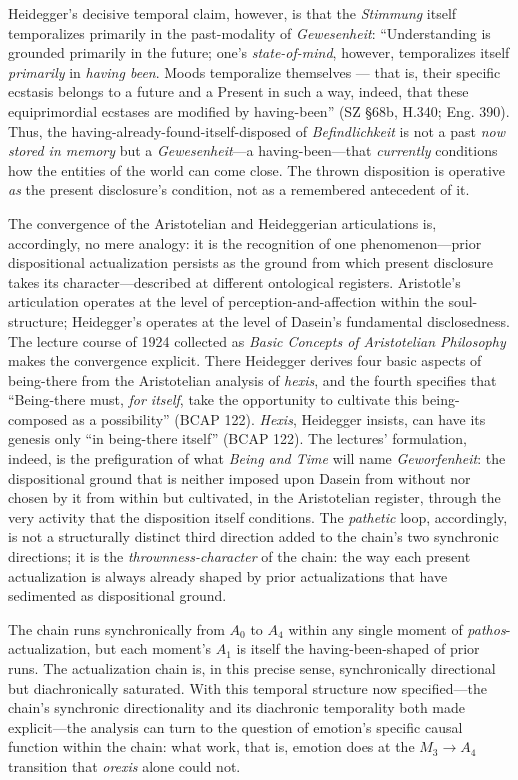 \documentclass{article}
\begin{document}
Heidegger's decisive temporal claim, however, is that the \textit{Stimmung} itself temporalizes primarily in the past-modality of \textit{Gewesenheit}: ``Understanding is grounded primarily in the future; one's \textit{state-of-mind}, however, temporalizes itself \textit{primarily} in \textit{having been}. Moods temporalize themselves --- that is, their specific ecstasis belongs to a future and a Present in such a way, indeed, that these equiprimordial ecstases are modified by having-been'' (SZ \S68b, H.340; Eng. 390). Thus, the having-already-found-itself-disposed of \textit{Befindlichkeit} is not a past \textit{now stored in memory} but a \textit{Gewesenheit}---a having-been---that \textit{currently} conditions how the entities of the world can come close. The thrown disposition is operative \textit{as} the present disclosure's condition, not as a remembered antecedent of it.

The convergence of the Aristotelian and Heideggerian articulations is, accordingly, no mere analogy: it is the recognition of one phenomenon---prior dispositional actualization persists as the ground from which present disclosure takes its character---described at different ontological registers. Aristotle's articulation operates at the level of perception-and-affection within the soul-structure; Heidegger's operates at the level of Dasein's fundamental disclosedness. The lecture course of 1924 collected as \textit{Basic Concepts of Aristotelian Philosophy} makes the convergence explicit. There Heidegger derives four basic aspects of being-there from the Aristotelian analysis of \textit{hexis}, and the fourth specifies that ``Being-there must, \textit{for itself}, take the opportunity to cultivate this being-composed as a possibility'' (BCAP 122). \textit{Hexis}, Heidegger insists, can have its genesis only ``in being-there itself'' (BCAP 122). The lectures' formulation, indeed, is the prefiguration of what \textit{Being and Time} will name \textit{Geworfenheit}: the dispositional ground that is neither imposed upon Dasein from without nor chosen by it from within but cultivated, in the Aristotelian register, through the very activity that the disposition itself conditions. The \textit{pathetic} loop, accordingly, is not a structurally distinct third direction added to the chain's two synchronic directions; it is the \textit{thrownness-character} of the chain: the way each present actualization is always already shaped by prior actualizations that have sedimented as dispositional ground.

The chain runs synchronically from $A_0$ to $A_4$ within any single moment of \textit{pathos}-actualization, but each moment's $A_1$ is itself the having-been-shaped of prior runs. The actualization chain is, in this precise sense, synchronically directional but diachronically saturated. With this temporal structure now specified---the chain's synchronic directionality and its diachronic temporality both made explicit---the analysis can turn to the question of emotion's specific causal function within the chain: what work, that is, emotion does at the $M_3 \rightarrow A_4$ transition that \textit{orexis} alone could not.
\end{document}
